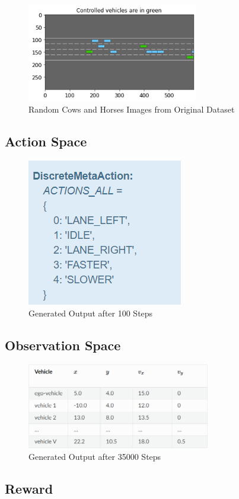 \documentclass[conference]{IEEEtran}
\begin{document}
\begin{figure}
\centerline{\includegraphics[width=75mm]{images/highway-env.png}}
\caption{Random Cows and Horses Images from Original Dataset}\label{fig1}
\end{figure}

\subsection{Action Space}

\begin{figure}
\centerline{\includegraphics[width=0.3\linewidth]{images/action_space.png}}
\caption{Generated Output after 100 Steps}
\label{fig2}
\end{figure}

\subsection{Observation Space}

\begin{figure}
\centerline{\includegraphics[width=80mm]{images/observation_space.png}}
\caption{Generated Output after 35000 Steps}
\label{fig3}
\end{figure}

\subsection{Reward}
\end{document}
